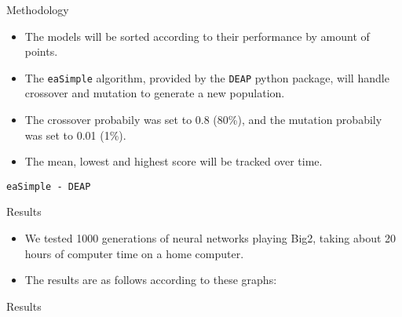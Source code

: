 \documentclass{beamer}
\begin{document}
\begin{frame}{Methodology}
	
	\begin{itemize}
		
		\item The models will be sorted according to their performance by amount of points.
		\item The \verb|eaSimple| algorithm, provided by the \texttt{DEAP} python package, will handle crossover and mutation to generate a new population.
		\item The crossover probabily was set to 0.8 (80\%), and the mutation probabily was set to 0.01 (1\%).
		\item The mean, lowest and highest score will be tracked over time.
		
	\end{itemize}
	
\end{frame}

\begin{frame}{\texttt{eaSimple - DEAP}}

\end{frame}

\begin{frame}{Results}
	
	\begin{itemize}
		\item We tested 1000 generations of neural networks playing Big2, taking about 20 hours of computer time on a home computer.
		\item The results are as follows according to these graphs:
	\end{itemize}
	
\end{frame}

\begin{frame}{Results}
\end{frame}
\end{document}
